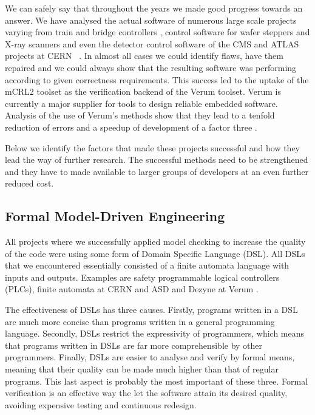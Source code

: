 \documentclass[sigplan,10pt,review]{acmart}\settopmatter{printfolios=true,printccs=false,printacmref=false}
\begin{document}
We can safely say that throughout the years we made good progress towards an answer. 
We have analysed the actual software of numerous large scale 
projects varying from train and bridge controllers \cite{GKRSW13,GKV95}, control software for wafer steppers \cite{Jonk16}
and X-ray scanners \cite{DBLP:journals/sttt/OsaiweranSHGR16} and even the 
detector control software of the CMS and ATLAS projects at CERN ~\cite{HwongKKLW13}. In almost all cases we could identify flaws, have them repaired
and we could always show that the resulting software was performing according to given correctness requirements. 
This success led to the uptake of the mCRL2
toolset as the verification backend of the Verum toolset. Verum is currently a major supplier for tools to design 
reliable embedded software. 
Analysis of the use of Verum's methods show that they lead to a tenfold reduction of errors and a speedup of development of 
a factor three \cite{DBLP:journals/sttt/OsaiweranSHGR16}. 

Below we identify the factors that made these projects successful and how they lead the way of further research.
The successful methods need to be strengthened and they have to made available to larger groups of
developers at an even further reduced cost. 


\subsection{Formal Model-Driven Engineering}

All projects where we successfully applied model checking to increase the quality of the
code were using some form of Domain Specific Language (DSL). All DSLs that we encountered
essentially consisted of a finite automata language with inputs and outputs. Examples
are safety programmable logical controllers (PLCs), finite automata at CERN and ASD and Dezyne
at Verum \cite{DBLP:conf/fm/Broadfoot05}. 

The effectiveness of DSLs has three causes. Firstly, programs written in a DSL are much more concise
than programs written in a general programming language. Secondly, DSLs restrict the expressivity of
programmers, which means that programs written in DSLs are far more comprehensible 
by other programmers. Finally, DSLs are easier to analyse and verify by formal means, meaning that
their quality can be made much higher than that of regular programs. This last aspect is probably the most important
of these three. Formal verification is an effective way the let the software attain its desired 
quality, avoiding expensive testing and continuous redesign. 
\end{document}
